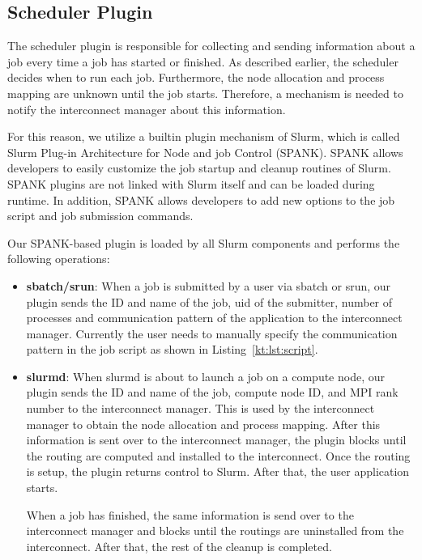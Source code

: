 \documentclass[graybox]{svmult}
\begin{document}
\subsection{Scheduler Plugin}

The scheduler plugin is responsible for collecting and sending information
about a job every time a job has started or finished. As described earlier,
the scheduler decides when to run each job. Furthermore, the node allocation
and process mapping are unknown until the job starts. Therefore, a mechanism
is needed to notify the interconnect manager about this information.

For this reason, we utilize a builtin plugin mechanism of Slurm, which is
called Slurm Plug-in Architecture for Node and job Control (SPANK). SPANK
allows developers to easily customize the job startup and cleanup routines of
Slurm. SPANK plugins are not linked with Slurm itself and can be loaded during
runtime. In addition, SPANK allows developers to add new options to the job
script and job submission commands.

Our SPANK-based plugin is loaded by all Slurm components and performs the
following operations:

\begin{itemize}
    \item \textbf{sbatch/srun}: When a job is submitted by a user via sbatch
        or srun, our plugin sends the ID and name of the job, uid of the
        submitter, number of processes and communication pattern of the
        application to the interconnect manager. Currently the user
        needs to manually specify the communication pattern in the job script
        as shown in Listing~\ref{kt:lst:script}.
    \item \textbf{slurmd}: When slurmd is about to launch a job on a compute
        node, our plugin sends the ID and name of the job, compute node ID,
        and MPI rank number to the interconnect manager. This is used by the
        interconnect manager to obtain the node allocation and process
        mapping. After this information is sent over to the interconnect
        manager, the plugin blocks until the routing are computed and
        installed to the interconnect. Once the routing is setup, the plugin
        returns control to Slurm. After that, the user application starts.

        When a job has finished, the same information is send over to the
        interconnect manager and blocks until the routings are uninstalled
        from the interconnect. After that, the rest of the cleanup is
        completed.
\end{itemize}
\end{document}
